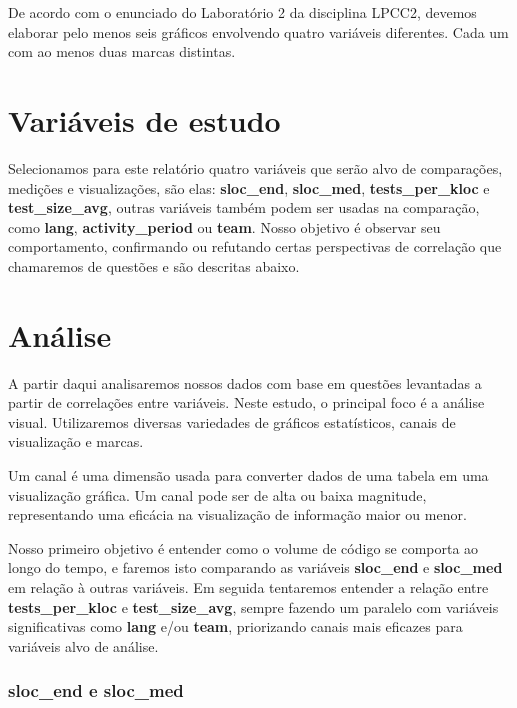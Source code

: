 \documentclass[]{article}
\begin{document}
De acordo com o enunciado do Laboratório 2 da disciplina LPCC2, devemos
elaborar pelo menos seis gráficos envolvendo quatro variáveis
diferentes. Cada um com ao menos duas marcas distintas.

\section{Variáveis de estudo}\label{variaveis-de-estudo}

Selecionamos para este relatório quatro variáveis que serão alvo de
comparações, medições e visualizações, são elas: \textbf{sloc\_end},
\textbf{sloc\_med}, \textbf{tests\_per\_kloc} e
\textbf{test\_size\_avg}, outras variáveis também podem ser usadas na
comparação, como \textbf{lang}, \textbf{activity\_period} ou
\textbf{team}. Nosso objetivo é observar seu comportamento, confirmando
ou refutando certas perspectivas de correlação que chamaremos de
questões e são descritas abaixo.

\section{Análise}\label{analise}

A partir daqui analisaremos nossos dados com base em questões levantadas
a partir de correlações entre variáveis. Neste estudo, o principal foco
é a análise visual. Utilizaremos diversas variedades de gráficos
estatísticos, canais de visualização e marcas.

Um canal é uma dimensão usada para converter dados de uma tabela em uma
visualização gráfica. Um canal pode ser de alta ou baixa magnitude,
representando uma eficácia na visualização de informação maior ou menor.

Nosso primeiro objetivo é entender como o volume de código se comporta
ao longo do tempo, e faremos isto comparando as variáveis
\textbf{sloc\_end} e \textbf{sloc\_med} em relação à outras variáveis.
Em seguida tentaremos entender a relação entre \textbf{tests\_per\_kloc}
e \textbf{test\_size\_avg}, sempre fazendo um paralelo com variáveis
significativas como \textbf{lang} e/ou \textbf{team}, priorizando canais
mais eficazes para variáveis alvo de análise.

\subsubsection{\texorpdfstring{\textbf{sloc\_end} e
\textbf{sloc\_med}}{sloc\_end e sloc\_med}}\label{sloc_end-e-sloc_med}
\end{document}
